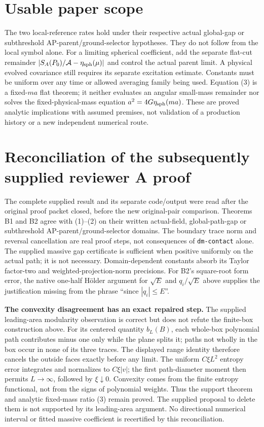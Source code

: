 \documentclass[10pt]{article}
\begin{document}
\section{Usable paper scope}
The two local-reference rates hold under their respective actual
global-gap or subthreshold AP-parent/ground-selector hypotheses.
They do not follow from the local symbol alone. For a limiting spherical
coefficient, add the separate flat-cut remainder
$|S_A(P_0)/\mathcal A-\eta_{\rm sph}(\mu)|$ and control the actual
parent limit. A physical evolved covariance still requires its separate
excitation estimate. Constants must be uniform over any time or allowed
averaging family being used. Equation (3) is a fixed-$ma$ flat theorem;
it neither evaluates an angular small-mass remainder nor solves the
fixed-physical-mass equation $a^2=4G\eta_{\rm sph}(ma)$.
These are proved analytic implications with assumed premises, not
validation of a production history or a new independent numerical route.

\section{Reconciliation of the subsequently supplied reviewer A proof}
The complete supplied result and its separate code/output were read
after the original proof packet closed, before the new original-pair
comparison. Theorems B1 and B2 agree with (1)--(2) on their written
actual-field, global-path-gap or subthreshold AP-parent/ground-selector
domains. The boundary trace norm and reversal cancellation are real
proof steps, not consequences of \texttt{dm-contact} alone. The
supplied massive gap certificate is sufficient when positive uniformly
on the actual path; it is not necessary. Domain-dependent constants
absorb its Taylor factor-two and weighted-projection-norm precisions.
For B2's square-root form error, the native one-half H\"older argument
for $\sqrt E$ and $q_i/\sqrt E$ above supplies the justification
missing from the phrase ``since $|q_i|\leq E$''.

\textbf{The convexity disagreement has an exact repaired step.}
The supplied leading-area modularity observation is correct but does
not refute the finite-box construction above. For its centered quantity
$b_L(B)$, each whole-box polynomial path contributes minus one only
while the plane splits it; paths not wholly in the box occur in none
of its three traces. The displayed range identity therefore cancels
the outside faces exactly before any limit. The uniform
$C\xi L^2$ entropy error integrates and normalizes to $C\xi|v|$;
the first path-diameter moment then permits $L\to\infty$, followed
by $\xi\downarrow0$. Convexity comes from the finite entropy
functional, not from the signs of polynomial weights. Thus the
support theorem and analytic fixed-mass ratio (3) remain proved.
The supplied proposal to delete them is not supported by its
leading-area argument. No directional numerical interval or fitted
massive coefficient is recertified by this reconciliation.
\end{document}
